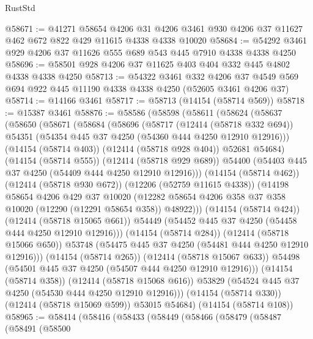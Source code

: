 \begin{lexlean}{RustStd}
\begin{coremodule}
{\begin{coremodule}
{{{{{{{{{{{{{{{{{{{{{{{{{{{{{{{{{{{{{{{{{{{{{{{{{{@58671 := @41271
    @58654
    @4206
    @31
    @4206
    @3461
    @930
    @4206
    @37
    @11627
    @462
    @672
    @822
    @429
    @11615
    @4338
    @4338
    @10020
@58684 := @54292 @3461 @929 @4206 @37 @11626 @555 @689 @543 @445 @7910 @4338 @4338 @4250
@58696 := @58501 @928 @4206 @37 @11625 @403 @404 @332 @445 @4802 @4338 @4338 @4250
@58713 := @54322
    @3461
    @332
    @4206
    @37
    @4549
    @569
    @694
    @922
    @445
    @11190
    @4338
    @4338
    @4250
    (@52605 @3461 @4206 @37)
@58714 := @14166 @3461
@58717 := @58713 (@14154 (@58714 @569))
@58718 := @15387 @3461
@58876 := @58586
    (@58598
      (@58611
        (@58624
          (@58637
            (@58650
              (@58671
                (@58684
                  (@58696
                    (@58717
                      (@12414 (@58718 @332 @694))
                      @54351
                      (@54354 @445 @37 @4250 (@54360 @444 @4250 @12910 @12916)))
                    (@14154 (@58714 @403))
                    (@12414 (@58718 @928 @404))
                    @52681
                    @54684)
                  (@14154 (@58714 @555))
                  (@12414 (@58718 @929 @689))
                  @54400
                  (@54403 @445 @37 @4250 (@54409 @444 @4250 @12910 @12916)))
                (@14154 (@58714 @462))
                (@12414 (@58718 @930 @672))
                (@12206 (@52759 @11615 @4338))
                (@14198
                  @58654
                  @4206
                  @429
                  @37
                  @10020
                  (@12282 @58654 @4206 @358 @37 @358 @10020 (@12290 (@12291 @58654 @358)) @48922)))
              (@14154 (@58714 @424))
              (@12414 (@58718 @15065 @661))
              @54449
              (@54452 @445 @37 @4250 (@54458 @444 @4250 @12910 @12916)))
            (@14154 (@58714 @284))
            (@12414 (@58718 @15066 @650))
            @53748
            (@54475 @445 @37 @4250 (@54481 @444 @4250 @12910 @12916)))
          (@14154 (@58714 @265))
          (@12414 (@58718 @15067 @633))
          @54498
          (@54501 @445 @37 @4250 (@54507 @444 @4250 @12910 @12916)))
        (@14154 (@58714 @358))
        (@12414 (@58718 @15068 @616))
        @53829
        (@54524 @445 @37 @4250 (@54530 @444 @4250 @12910 @12916)))
      (@14154 (@58714 @330))
      (@12414 (@58718 @15069 @599))
      @53015
      @54684)
    (@14154 (@58714 @108))
@58965 := @58414
    (@58416
      (@58433
        (@58449
          (@58466
            (@58479
              (@58487
                (@58491
                  (@58500
}}}}}}}}}}}}}}}}}}}}}}}}}}}}}}}}}}}}}}}}}}}}}}}}}}
\end{coremodule}}
\end{coremodule}
\end{lexlean}
